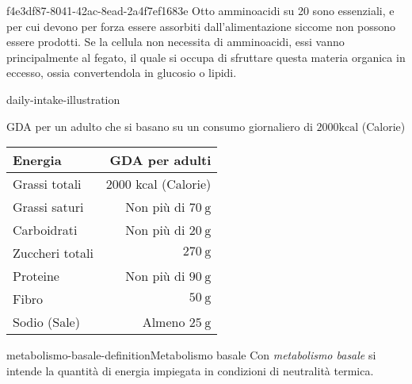 \documentclass[preview]{standalone}
\begin{document}




\begin{snippet}{f4e3df87-8041-42ac-8ead-2a4f7ef1683e}
    Otto amminoacidi su 20 sono essenziali, e per cui devono per forza essere assorbiti dall'alimentazione
siccome non possono essere prodotti. 
Se la cellula non necessita di amminoacidi, essi vanno principalmente al fegato, il quale si occupa
di sfruttare questa materia organica in eccesso, ossia convertendola in glucosio o lipidi.
\end{snippet}


\begin{snippet}{daily-intake-illustration}
    \begin{center}
    GDA per un adulto che si basano su un consumo giornaliero di $2000 \mathrm{kcal}$ (Calorie)
    \begin{tabular}{|l|r|}
    \hline Energia & GDA per adulti \\
    \hline Grassi totali & 2000 kcal (Calorie) \\
    \hline Grassi saturi & Non più di $70 \mathrm{~g}$ \\
    \hline Carboidrati & Non più di $20 \mathrm{~g}$ \\
    \hline Zuccheri totali & $270 \mathrm{~g}$ \\
    \hline Proteine & Non più di $90 \mathrm{~g}$ \\
    \hline Fibro & $50 \mathrm{~g}$ \\
    \hline Sodio (Sale) & Almeno $25 \mathrm{~g}$ \\
    \hline
    \end{tabular}
    \end{center}
    \phantom{}
\end{snippet}


\begin{snippetdefinition}{metabolismo-basale-definition}{Metabolismo basale}
    Con \textit{metabolismo basale} si intende la quantità di energia impiegata in condizioni di neutralità termica.
\end{snippetdefinition}
\end{document}
